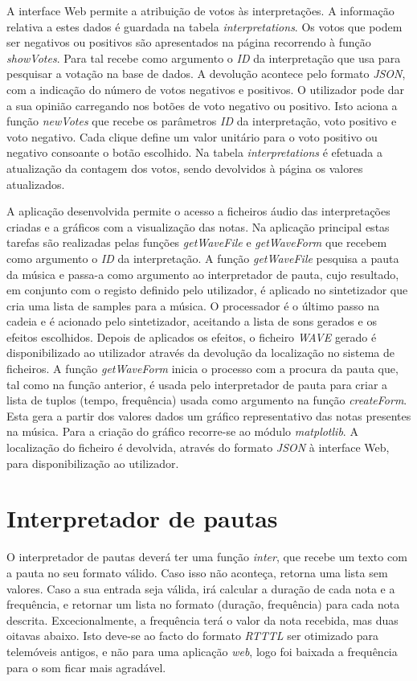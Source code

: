 \documentclass[11pt,openany,twoside]{report}
\begin{document}
A interface Web permite a atribuição de votos às interpretações. A informação relativa a estes dados é guardada na tabela \textit{interpretations}. Os votos que podem ser negativos ou positivos são apresentados na página recorrendo à função \textit{showVotes}. Para tal recebe como argumento o \textit{ID} da interpretação que usa para pesquisar a votação na base de dados. A devolução acontece pelo formato \textit{JSON}, com a indicação do número de votos negativos e positivos. O utilizador pode dar a sua opinião carregando nos botões de voto negativo ou positivo. Isto aciona a função \textit{newVotes} que recebe os parâmetros \textit{ID} da interpretação, voto positivo e voto negativo. Cada clique define um valor unitário para o voto positivo ou negativo consoante o botão escolhido. Na tabela \textit{interpretations} é efetuada a atualização da contagem dos votos, sendo devolvidos à página os valores atualizados.

A aplicação desenvolvida permite o acesso a ficheiros áudio das interpretações criadas e a gráficos com a visualização das notas. Na aplicação principal estas tarefas são realizadas pelas funções \textit{getWaveFile} e \textit{getWaveForm} que recebem como argumento o \textit{ID} da interpretação. A função \textit{getWaveFile} pesquisa a pauta da música e passa-a como argumento ao interpretador de pauta, cujo resultado, em conjunto com o registo definido pelo utilizador, é aplicado no sintetizador que cria uma lista de samples para a música. O processador é o último passo na cadeia e é acionado pelo sintetizador, aceitando a lista de sons gerados e os efeitos escolhidos. Depois de aplicados os efeitos, o ficheiro \textit{WAVE} gerado é disponibilizado ao utilizador através da devolução da localização no sistema de ficheiros. A função \textit{getWaveForm} inicia o processo com a procura da pauta que, tal como na função anterior, é usada pelo interpretador de pauta para criar a lista de tuplos (tempo, frequência) usada como argumento na função \textit{createForm}. Esta gera a partir dos valores dados um gráfico representativo das notas presentes na música. Para a criação do gráfico recorre-se ao módulo \textit{matplotlib}. A localização do ficheiro é devolvida, através do formato \textit{JSON} à interface Web, para disponibilização ao utilizador.

\section{Interpretador de pautas}
O interpretador de pautas deverá ter uma função \textit{inter}, que recebe um texto com a pauta no seu formato válido. Caso isso não aconteça, retorna uma lista sem valores. Caso a sua entrada seja válida, irá calcular a duração de cada nota e a frequência, e retornar um lista no formato (duração, frequência) para cada nota descrita. Excecionalmente, a frequência terá o valor da nota recebida, mas duas oitavas abaixo. Isto deve-se ao facto do formato \textit{RTTTL} ser otimizado para telemóveis antigos, e não para uma aplicação \textit{web}, logo foi baixada a frequência para o som ficar mais agradável.
\end{document}
